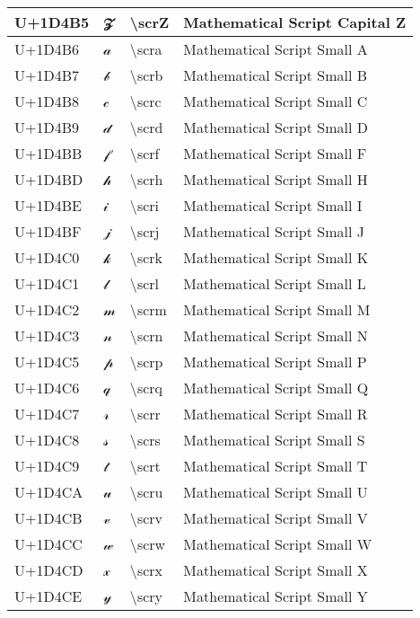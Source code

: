 \begin{table}[h]
\begin{tabulary}{\linewidth}{|L|L|L|L|}
\hline
U+1D4B5 & 𝒵 & {\textbackslash}scrZ & Mathematical Script Capital Z \\
\hline
U+1D4B6 & 𝒶 & {\textbackslash}scra & Mathematical Script Small A \\
\hline
U+1D4B7 & 𝒷 & {\textbackslash}scrb & Mathematical Script Small B \\
\hline
U+1D4B8 & 𝒸 & {\textbackslash}scrc & Mathematical Script Small C \\
\hline
U+1D4B9 & 𝒹 & {\textbackslash}scrd & Mathematical Script Small D \\
\hline
U+1D4BB & 𝒻 & {\textbackslash}scrf & Mathematical Script Small F \\
\hline
U+1D4BD & 𝒽 & {\textbackslash}scrh & Mathematical Script Small H \\
\hline
U+1D4BE & 𝒾 & {\textbackslash}scri & Mathematical Script Small I \\
\hline
U+1D4BF & 𝒿 & {\textbackslash}scrj & Mathematical Script Small J \\
\hline
U+1D4C0 & 𝓀 & {\textbackslash}scrk & Mathematical Script Small K \\
\hline
U+1D4C1 & 𝓁 & {\textbackslash}scrl & Mathematical Script Small L \\
\hline
U+1D4C2 & 𝓂 & {\textbackslash}scrm & Mathematical Script Small M \\
\hline
U+1D4C3 & 𝓃 & {\textbackslash}scrn & Mathematical Script Small N \\
\hline
U+1D4C5 & 𝓅 & {\textbackslash}scrp & Mathematical Script Small P \\
\hline
U+1D4C6 & 𝓆 & {\textbackslash}scrq & Mathematical Script Small Q \\
\hline
U+1D4C7 & 𝓇 & {\textbackslash}scrr & Mathematical Script Small R \\
\hline
U+1D4C8 & 𝓈 & {\textbackslash}scrs & Mathematical Script Small S \\
\hline
U+1D4C9 & 𝓉 & {\textbackslash}scrt & Mathematical Script Small T \\
\hline
U+1D4CA & 𝓊 & {\textbackslash}scru & Mathematical Script Small U \\
\hline
U+1D4CB & 𝓋 & {\textbackslash}scrv & Mathematical Script Small V \\
\hline
U+1D4CC & 𝓌 & {\textbackslash}scrw & Mathematical Script Small W \\
\hline
U+1D4CD & 𝓍 & {\textbackslash}scrx & Mathematical Script Small X \\
\hline
U+1D4CE & 𝓎 & {\textbackslash}scry & Mathematical Script Small Y \\

\end{tabulary}
\end{table}
